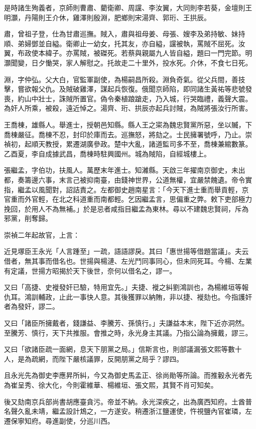 \begin{pinyinscope}
是時諸生殉義者，京師則曹肅、藺衛卿、周讜、李汝翼，大同則李若葵，金壇則王明灝，丹陽則王介休，雞澤則殷淵，肥鄉則宋湯齊、郭珩、王拱辰。

肅，曾祖子登，仕為甘肅巡撫。賊入，肅與祖母姜、母張、嫂李及弟持敏、妹持順、弟婦鄧並自縊。衛卿止一幼女，托其友，亦自縊，讜被執，罵賊不屈死。汝翼，布政使本緯子。亦罵賊，被磔死。若蔡與親屬九人皆自縊，題曰一門完節。明灝聞變，日夕慟哭，家人解慰之。托故走二十里外，投水死。介休，不食七日死。

淵，字仲弘。父大白，官監軍副使，為楊嗣昌所殺。淵負奇氣。從父兵間，善技擊，嘗欲報父仇。及賊破雞澤，謀起兵恢復。俄聞京師陷，即同諸生黃祐等悲號發喪，約山中壯士，誅賊所置官。偽令秦植踉蹌走，乃入城，行哭臨禮，義聲大震。為奸人所乘，被殺，遠近悼之。湯齊、珩、拱辰亦起兵討賊，為賊將張汝行所害。

王喬棟，雄縣人。舉進士，授朝邑知縣。縣人王之寀為魏忠賢黨所惡，坐以贓，下喬棟嚴征。喬棟不忍，封印於庫而去。巡撫怒，將劾之。士民擁署號呼，乃止。崇禎初，起順天教授，累遷湖廣參政。楚中大亂，諸道監司多不至，喬棟兼綰數篆。乙酉夏，李自成據武昌，喬棟時駐興國州。城為賊陷，自經城樓上。

張繼孟，字伯功，扶風人。萬歷末年進士。知濰縣。天啟三年擢南京御史，未出都，奏籌邊六事，末言己被抑南臺，由錢神世界，公道無權，宜嚴禁餽遺。帝令實指，繼孟以風聞對，詔詰責之。左都御史趙南星言：「今天下進士重而舉貢輕，京官重而外官輕，在北之科道重而南都輕。乞因繼孟言，思偏重之弊。敕下吏部極力挽回，於用人不為無補。」於是忌者咸指目繼孟為東林。尋以不建魏忠賢祠，斥為邪黨，削奪歸。

崇禎二年起故官，上言：

近見塚臣王永光「人言踵至」一疏，語語謬戾。其曰「惠世揚等借題當議」。夫云借者，無其事而借名也。世揚與楊漣、左光鬥同事同心，但未同死耳。今楊、左業有定議，世揚方昭揭於天下後世，奈何以借名之，謬一。

又曰「高捷、史褷發奸已驗，特用宜先。」夫捷、褷之糾劉鴻訓也，為楊維垣等報仇耳。鴻訓輔政，止此一事快人意。其後獲罪以納賄，非以捷、褷劾也。今指護奸者為發奸，謬二。

又曰「諸臣所擁戴者，錢謙益、李騰芳、孫慎行。」夫謙益本末，陛下近亦洞然。至騰芳、慎行，天下共推服。會推之時，永光身主其議。乃指公論為擁戴，謬三。

又曰「欲諸臣疏一面網，息天下朋黨之局。」信斯言也，則部議漏張文熙等數十人，是為疏網，而陛下嚴核議罪，反開朋黨之局乎？謬四。

且永光先為御史李應昇所糾，今又為御史馬孟正、徐尚勛等所論。而推轂永光者先為崔呈秀、徐大化，今則霍維華、楊維垣、張文熙，其賢不肖可知矣。

後又劾南京兵部尚書胡應臺貪污。帝並不納。永光深疾之，出為廣西知府。土酋普名聲久亂未靖，繼孟設計鴆之，一方遂安。稍遷浙江鹽運使，忤視鹽內官崔璘，左遷保寧知府。尋進副使，分巡川西。


\end{pinyinscope}
